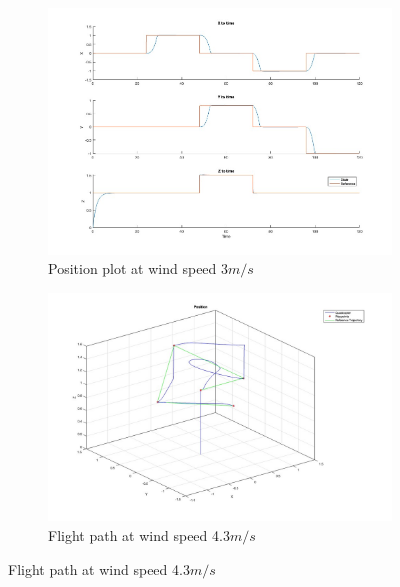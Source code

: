 \documentclass[12pt]{article}
\begin{document}
\begin{figure}[H]
    \centering
    \begin{subfigure}{.5\linewidth}
        \centering
        \includegraphics[width=\linewidth]{figures/evaluation_position_air_optimal}
        \caption{Position plot at wind speed 3$m/s$}
        \label{fig:optimal_air_position_evaluation}
    \end{subfigure}
    \begin{subfigure}{.45\linewidth}
        \centering
        \includegraphics[width=\linewidth]{figures/pid_flight_path_strong_wind}
        \caption{Flight path at wind speed 4.3$m/s$}
        \label{fig:pid_flight_path_strong_wind}
    \end{subfigure}
\end{figure}
\end{document}
